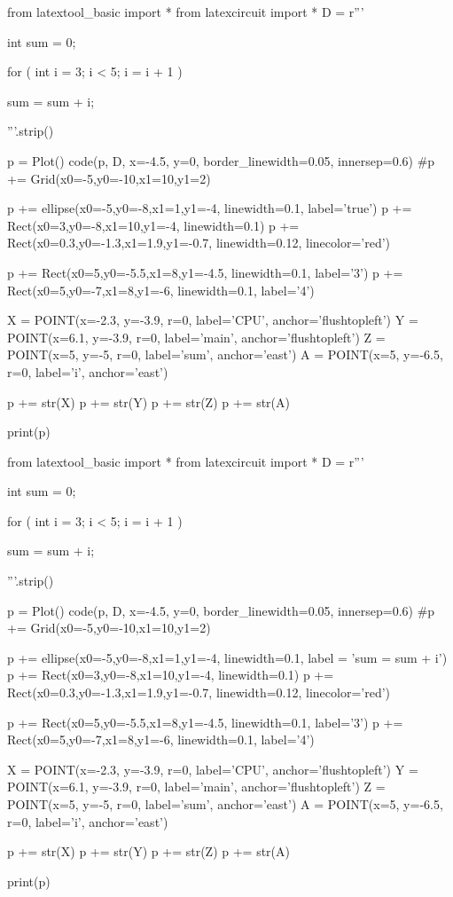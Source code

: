 \begin{python}
from latextool_basic import *
from latexcircuit import *
D = r'''



int sum = 0;

    for ( int i = 3;     i < 5;     i = i + 1 )


        sum = sum + i;



'''.strip()

p = Plot()
code(p, D, x=-4.5, y=0, border_linewidth=0.05, innersep=0.6)
#p += Grid(x0=-5,y0=-10,x1=10,y1=2)

p += ellipse(x0=-5,y0=-8,x1=1,y1=-4, linewidth=0.1, label='true')
p += Rect(x0=3,y0=-8,x1=10,y1=-4, linewidth=0.1)
p += Rect(x0=0.3,y0=-1.3,x1=1.9,y1=-0.7, linewidth=0.12, linecolor='red')

p += Rect(x0=5,y0=-5.5,x1=8,y1=-4.5, linewidth=0.1, label='3')
p += Rect(x0=5,y0=-7,x1=8,y1=-6, linewidth=0.1, label='4')

X = POINT(x=-2.3, y=-3.9, r=0, label='CPU', anchor='flushtopleft')
Y = POINT(x=6.1, y=-3.9, r=0, label='main', anchor='flushtopleft')
Z = POINT(x=5, y=-5, r=0, label='sum', anchor='east')
A = POINT(x=5, y=-6.5, r=0, label='i', anchor='east')

p += str(X)
p += str(Y)
p += str(Z)
p += str(A)

print(p)
\end{python}

\begin{python}
from latextool_basic import *
from latexcircuit import *
D = r'''



int sum = 0;

    for ( int i = 3;     i < 5;     i = i + 1 )


        sum = sum + i;



'''.strip()

p = Plot()
code(p, D, x=-4.5, y=0, border_linewidth=0.05, innersep=0.6)
#p += Grid(x0=-5,y0=-10,x1=10,y1=2)

p += ellipse(x0=-5,y0=-8,x1=1,y1=-4, linewidth=0.1, label = 'sum = sum + i')
p += Rect(x0=3,y0=-8,x1=10,y1=-4, linewidth=0.1)
p += Rect(x0=0.3,y0=-1.3,x1=1.9,y1=-0.7, linewidth=0.12, linecolor='red')

p += Rect(x0=5,y0=-5.5,x1=8,y1=-4.5, linewidth=0.1, label='3')
p += Rect(x0=5,y0=-7,x1=8,y1=-6, linewidth=0.1, label='4')

X = POINT(x=-2.3, y=-3.9, r=0, label='CPU', anchor='flushtopleft')
Y = POINT(x=6.1, y=-3.9, r=0, label='main', anchor='flushtopleft')
Z = POINT(x=5, y=-5, r=0, label='sum', anchor='east')
A = POINT(x=5, y=-6.5, r=0, label='i', anchor='east')

p += str(X)
p += str(Y)
p += str(Z)
p += str(A)

print(p)
\end{python}

